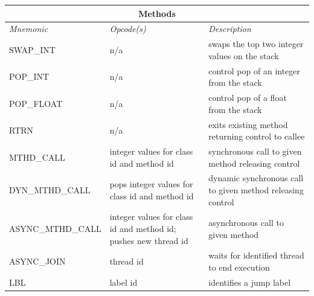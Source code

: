 \documentclass[11pt]{article}
\begin{document}
\begin{center}
  \vspace{\baselineskip}
  \begin{tabular}{| l | p{4 cm} | p{6 cm} |}
    \hline
    \multicolumn{3}{|c|}{\textbf{Methods}} \\
    \hline
    \emph{Mnemonic}  &  \emph{Opcode(s)}  &  \emph{Description} \\ \hline \hline
    SWAP\_INT & n/a & swaps the top two integer values on the stack \\ \hline
    POP\_INT & n/a & control pop of an integer from the stack \\ \hline
    POP\_FLOAT & n/a & control pop of a float from the stack \\ \hline
    RTRN & n/a & exits existing method returning control to callee \\ \hline
    MTHD\_CALL & integer values for class id and method id & synchronous call to given method releasing control \\ \hline
    DYN\_MTHD\_CALL & pops integer values for class id and method id & dynamic synchronous call to given method releasing control \\ \hline
    ASYNC\_MTHD\_CALL & integer values for class id and method id; pushes new thread id & asynchronous call to given method \\ \hline
    ASYNC\_JOIN & thread id & waits for identified thread to end execution \\ \hline
    LBL & label id & identifies a jump label \\ \hline
  \end{tabular}


\end{center}
\end{document}
